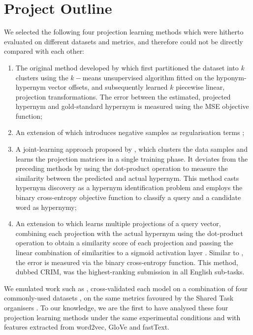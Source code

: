 \section{Project Outline} %
We selected the following four projection learning methods which were hitherto evaluated on different datasets and metrics, and  therefore could not be directly compared with each other:
\begin{enumerate}
    \item The original method developed by \citet{Fu2014} which first partitioned the dataset into $k$ clusters using the $k-$means unsupervised algorithm fitted on the hyponym-hypernym vector offsets, and subsequently learned $k$ piecewise linear, projection transformations.  The error between the estimated, projected hypernym and gold-standard hypernym is measured using the \ac{MSE} objective function;
    \item An extension of \citep{Fu2014} which introduces negative samples as regularisation terms \citep{ustalov2017negative};
    \item A joint-learning approach proposed by \citet{yamane2016distributional}, which clusters the data samples and learns the projection matrices in a single training phase.  It deviates from the preceding methods by using the dot-product operation to measure the similarity between the predicted and actual hypernym.  This method casts hypernym discovery as a hypernym identification problem and employs the binary cross-entropy objective function to classify a query and a candidate word as hypernymy;
    \item An extension to \citet{yamane2016distributional} which learns multiple projections of a query vector, combining each projection with the actual hypernym using the dot-product operation to obtain a similarity score of each projection and passing the linear combination of similarities to a sigmoid activation layer \citep{bernier2018crim}.  Similar to \citet{yamane2016distributional}, the error is measured via the binary cross-entropy function.  This method, dubbed CRIM, was the highest-ranking submission in all English sub-tasks.
\end{enumerate}
We emulated work such as \citep{shwartz2017siege, levy2015supervised}, cross-validated each model on a combination of four commonly-used datasets \citep{santus2015evalution, Baroni2011, santus2016nine, necsulescu2015reading}, on the same metrics favoured by the Shared Task organisers \citep{camacho2018semeval}.  To our knowledge, we are the first to have analysed these four projection learning methods under the same experimental conditions and with features extracted from word2vec, GloVe and fastText.

